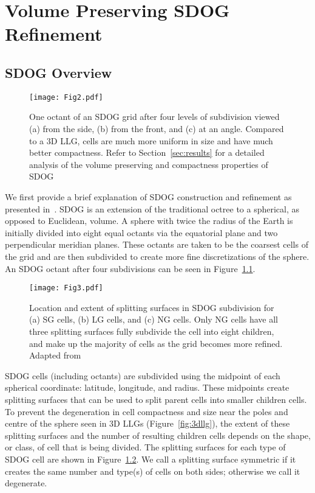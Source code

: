 \chapter{Volume Preserving SDOG Refinement}


\section{SDOG Overview}

\begin{figure}[tbp]
	\texttt{[image: Fig2.pdf]}
	\caption{One octant of an SDOG grid after four levels of subdivision viewed (a) from the side, (b) from the front, and (c) at an angle.
		Compared to a 3D LLG, cells are much more uniform in size and have much better compactness.
		Refer to Section~\ref{sec:results} for a detailed analysis of the volume preserving and compactness properties of SDOG}
	\label{fig:sdog}
\end{figure}


We first provide a brief explanation of SDOG construction and refinement as presented in~\cite{yu2009sdog}.
SDOG is an extension of the traditional octree to a spherical, as opposed to Euclidean, volume.
A sphere with twice the radius of the Earth is initially divided into eight equal octants via the equatorial plane and two perpendicular meridian planes.
These octants are taken to be the coarsest cells of the grid and are then subdivided to create more fine discretizations of the sphere.
An SDOG octant after four subdivisions can be seen in Figure~\ref{fig:sdog}.


\begin{figure}[tbp]
	\texttt{[image: Fig3.pdf]}
	\caption{Location and extent of splitting surfaces in SDOG subdivision for (a) SG cells, (b) LG cells, and (c) NG cells.
		Only NG cells have all three splitting surfaces fully subdivide the cell into eight children, and make up the majority of cells as the grid becomes more refined.
		Adapted from~\cite{yu2009sdog}}
	\label{fig:subRules}
\end{figure}


SDOG cells (including octants) are subdivided using the midpoint of each spherical coordinate: latitude, longitude, and radius.
These midpoints create splitting surfaces that can be used to split parent cells into smaller children cells.
To prevent the degeneration in cell compactness and size near the poles and centre of the sphere seen in 3D LLGs (Figure~\ref{fig:3dllg}), the extent of these splitting surfaces and the number of resulting children cells depends on the shape, or class, of cell that is being divided.
The splitting surfaces for each type of SDOG cell are shown in Figure~\ref{fig:subRules}.
We call a splitting surface symmetric if it creates the same number and type(s) of cells on both sides; otherwise we call it degenerate.


